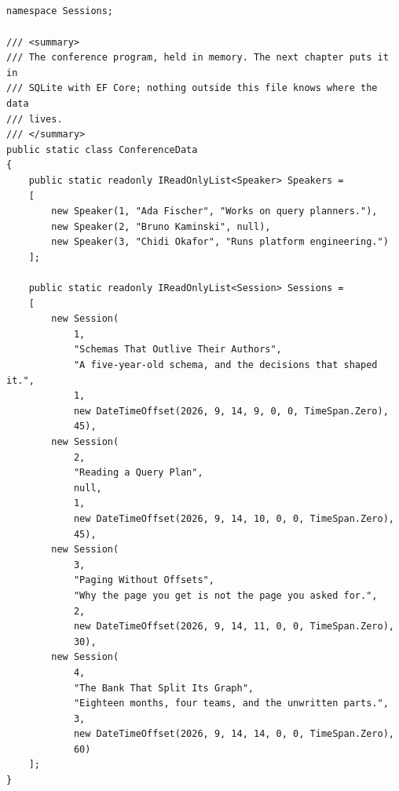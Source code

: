 \subsection*{}
\begin{verbatim}
namespace Sessions;

/// <summary>
/// The conference program, held in memory. The next chapter puts it in
/// SQLite with EF Core; nothing outside this file knows where the data
/// lives.
/// </summary>
public static class ConferenceData
{
    public static readonly IReadOnlyList<Speaker> Speakers =
    [
        new Speaker(1, "Ada Fischer", "Works on query planners."),
        new Speaker(2, "Bruno Kaminski", null),
        new Speaker(3, "Chidi Okafor", "Runs platform engineering.")
    ];

    public static readonly IReadOnlyList<Session> Sessions =
    [
        new Session(
            1,
            "Schemas That Outlive Their Authors",
            "A five-year-old schema, and the decisions that shaped it.",
            1,
            new DateTimeOffset(2026, 9, 14, 9, 0, 0, TimeSpan.Zero),
            45),
        new Session(
            2,
            "Reading a Query Plan",
            null,
            1,
            new DateTimeOffset(2026, 9, 14, 10, 0, 0, TimeSpan.Zero),
            45),
        new Session(
            3,
            "Paging Without Offsets",
            "Why the page you get is not the page you asked for.",
            2,
            new DateTimeOffset(2026, 9, 14, 11, 0, 0, TimeSpan.Zero),
            30),
        new Session(
            4,
            "The Bank That Split Its Graph",
            "Eighteen months, four teams, and the unwritten parts.",
            3,
            new DateTimeOffset(2026, 9, 14, 14, 0, 0, TimeSpan.Zero),
            60)
    ];
}
\end{verbatim}

